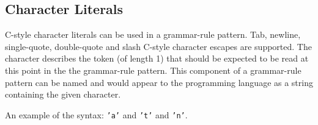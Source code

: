 
\subsection{Character Literals}
{
	C-style character literals can be used in a grammar-rule pattern.
	Tab, newline, single-quote, double-quote and slash C-style character
	escapes are supported.
	The character describes the token (of length 1) that should be expected
	to be read at this point in the the grammar-rule pattern.
	This component of a grammar-rule pattern can be named and would appear to
	the programming language as a string containing the given character.
	
	An example of the syntax: \texttt{'a'} and \texttt{'t'}
	and \texttt{'n'}.
}
